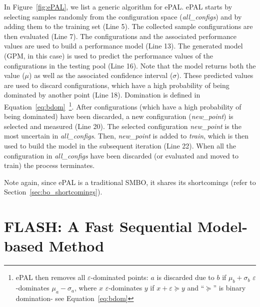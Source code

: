 \documentclass[10pt,journal,compsoc]{IEEEtran}
\begin{document}
In Figure~\ref{fig:ePAL}, we list a generic algorithm for ePAL. ePAL starts by selecting samples randomly from the configuration space (\textit{all\_configs}) and by adding them to the training set (Line 5). The collected sample configurations are then evaluated (Line 7). The configurations and the associated performance values are used to build a performance model (Line 13). The generated model (GPM, in this case) is used to predict the performance values of the configurations in the testing pool (Line 16). Note that the model returns both the value ($\mu$) as well as the associated confidence interval ($\sigma$). These predicted values are used to discard configurations, which have a high probability of being dominated by another point (Line 18). Domination is defined in Equation~\ref{eq:bdom}~\footnote{ePAL then removes all  $\varepsilon$-dominated points:
$a$ is discarded due to $b$ if $\mu_b + \sigma_b$  $\varepsilon$-dominates $\mu_a - \sigma_a$, where  
$x$  $\varepsilon$-dominates $y$ if $x + \varepsilon \succeq  y$
and  ``$\succeq$'' is   binary domination- see Equation~\ref{eq:bdom}}. After configurations (which have a high probability of being dominated) have been discarded, a new configuration (\textit{new\_point}) is selected and measured (Line 20). The selected configuration \textit{new\_point} is the most uncertain in \textit{all\_configs}. Then, \textit{new\_point} is added to \textit{train}, which is then used to build the model in the subsequent iteration (Line 22). When all the configuration in \textit{all\_configs} have been discarded (or evaluated and moved to train) the process terminates.

Note again, since ePAL is a traditional SMBO, it shares its shortcomings (refer to Section~\ref{sec:bo_shortcomings}).



\section{{\bfseries FLASH}: A Fast Sequential Model-based Method}
 
\end{document}
